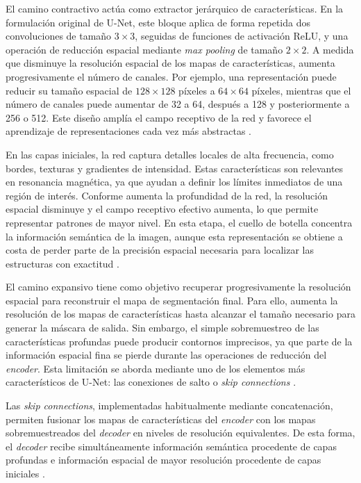 El camino contractivo actúa como extractor jerárquico de características. En la formulación original de U-Net, este bloque aplica de forma repetida dos convoluciones de tamaño \(3 \times 3\), seguidas de funciones de activación ReLU, y una operación de reducción espacial mediante \textit{max pooling} de tamaño \(2 \times 2\). A medida que disminuye la resolución espacial de los mapas de características, aumenta progresivamente el número de canales. Por ejemplo, una representación puede reducir su tamaño espacial de \(128 \times 128\) píxeles a \(64 \times 64\) píxeles, mientras que el número de canales puede aumentar de 32 a 64, después a 128 y posteriormente a 256 o 512. Este diseño amplía el campo receptivo de la red y favorece el aprendizaje de representaciones cada vez más abstractas \citep{ronneberger2015unet}.

En las capas iniciales, la red captura detalles locales de alta frecuencia, como bordes, texturas y gradientes de intensidad. Estas características son relevantes en resonancia magnética, ya que ayudan a definir los límites inmediatos de una región de interés. Conforme aumenta la profundidad de la red, la resolución espacial disminuye y el campo receptivo efectivo aumenta, lo que permite representar patrones de mayor nivel. En esta etapa, el cuello de botella concentra la información semántica de la imagen, aunque esta representación se obtiene a costa de perder parte de la precisión espacial necesaria para localizar las estructuras con exactitud \citep{ronneberger2015unet,shen2017deep}.

El camino expansivo tiene como objetivo recuperar progresivamente la resolución espacial para reconstruir el mapa de segmentación final. Para ello, aumenta la resolución de los mapas de características hasta alcanzar el tamaño necesario para generar la máscara de salida. Sin embargo, el simple sobremuestreo de las características profundas puede producir contornos imprecisos, ya que parte de la información espacial fina se pierde durante las operaciones de reducción del \textit{encoder}. Esta limitación se aborda mediante uno de los elementos más característicos de U-Net: las conexiones de salto o \textit{skip connections} \citep{ronneberger2015unet}.

Las \textit{skip connections}, implementadas habitualmente mediante concatenación, permiten fusionar los mapas de características del \textit{encoder} con los mapas sobremuestreados del \textit{decoder} en niveles de resolución equivalentes. De esta forma, el \textit{decoder} recibe simultáneamente información semántica procedente de capas profundas e información espacial de mayor resolución procedente de capas iniciales \citep{ronneberger2015unet}.

